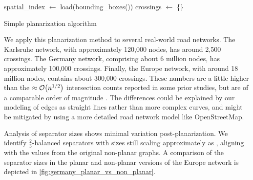 \begin{algorithm}[tbhp]
    \BlankLine
    spatial\_index \(\longleftarrow\) load(bounding\_boxes(\E))\;
    crossings \(\longleftarrow\) \{\}\;
    \caption{Simple planarization algorithm \label{alg:planarization}}
\end{algorithm}

We apply this planarization method to several real-world road networks.
The Karlsruhe network, with approximately 120,000 nodes, has around 2,500 crossings.
The Germany network, comprising about 6 million nodes, has approximately 100,000 crossings.
Finally, the Europe network, with around 18 million nodes, contains about 300,000 crossings.
These numbers are a little higher than the \( \approx \mathcal{O}\!\left(n^{1/2}\right) \) intersection counts reported in some prior studies, but are of a comparable order of magnitude \cite{eppstein_studying_2008}.
The differences could be explained by our modeling of edges as straight lines rather than more complex curves, and might be mitigated by using a more detailed road network model like OpenStreetMap.

Analysis of separator sizes shows minimal variation post-planarization.
We identify \(\frac{2}{3}\)-balanced separators with sizes still scaling approximately as , aligning with the values from the original non-planar graphs.
A comparison of the separator sizes in the planar and non-planar versions of the Europe network is depicted in \cref{fig:germany_planar_vs_non_planar}.

